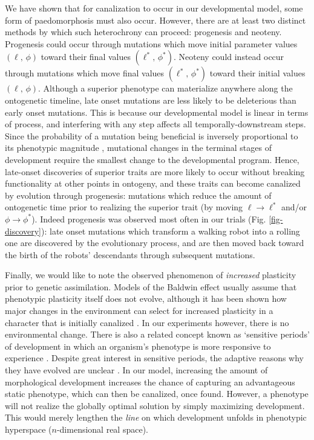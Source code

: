 We have shown that 
for canalization to occur in our developmental model, some form of paedomorphosis must also occur. However, there are at least two distinct methods by which such heterochrony can proceed: progenesis and neoteny.
Progenesis 
could occur through mutations which move initial parameter values $(\ell,\, \phi)$ toward their final values $(\ell^*,\, \phi^*)$.
Neoteny 
could instead occur through mutations which move final values $(\ell^*,\, \phi^*)$ toward their initial values $(\ell,\, \phi)$.
Although a superior phenotype can materialize anywhere along the ontogenetic timeline, late onset mutations are less likely to be deleterious than early onset mutations.
This is because our developmental model is linear in terms of process, and interfering with any step affects all temporally-downstream steps. 
Since the probability of a mutation being beneficial is inversely proportional to its phenotypic magnitude \cite{fisher1930genetical}, mutational changes in the terminal stages of development require the smallest change to the developmental program.
Hence, late-onset discoveries of superior traits are more likely to occur without breaking functionality at other points in ontogeny, and these traits can become canalized by evolution through progenesis: mutations which reduce the amount of ontogenetic time prior to realizing the superior trait (by moving $\ell \rightarrow \ell^*$ and/or $\phi \rightarrow \phi^*$). 
Indeed progenesis was observed most often in our trials (Fig. \ref{fig-discovery}): late onset mutations which transform a walking robot into a rolling one are discovered by the evolutionary process, and are then moved back toward the birth of the robots'
descendants through subsequent mutations.

Finally, we would like to note the observed phenomenon of \textit{increased} 
plasticity prior to genetic assimilation.
Models of the Baldwin effect usually assume that phenotypic plasticity itself does not evolve, although it has been shown how major changes in the environment can select for increased plasticity in a character that is initially canalized \cite{lande2009adaptation}.
In our experiments however, there is no environmental change.
There is also a related concept known as `sensitive periods' of development in which an organism's phenotype is more responsive to experience 
\cite{bateson1979sensitive}.
Despite great interest in sensitive periods, the adaptive reasons why they have evolved are unclear \cite{Fawcett2015}.
In our model, increasing the amount of morphological development increases the chance of capturing an advantageous static phenotype, which can then be canalized, once found.
However, a phenotype will not realize the globally optimal solution by simply maximizing development.
This would merely lengthen the \textit{line} on which development unfolds in phenotypic hyperspace ($n$-dimensional real space).


